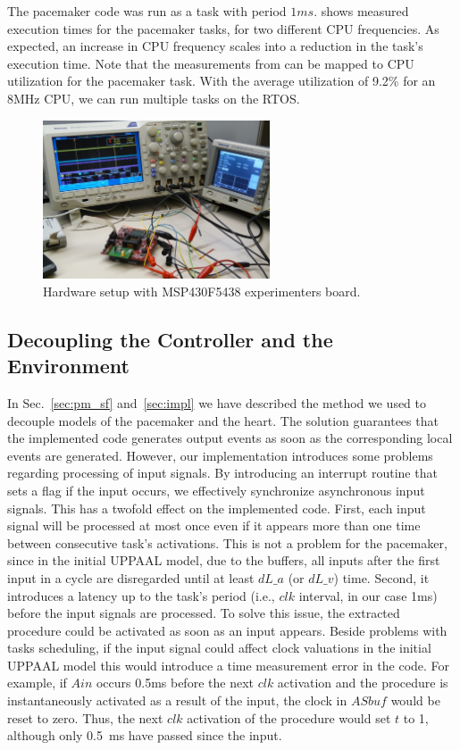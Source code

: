 The pacemaker code was run as a task with period $1ms$.  shows measured execution times for the pacemaker tasks, for two different CPU frequencies. As expected, an increase in CPU frequency scales into a reduction in the task's execution time. Note that the measurements from  can be mapped to CPU utilization for the pacemaker task. With the average utilization of 9.2\% for an 8MHz CPU, we can run multiple tasks on the RTOS. 


\begin{figure} [!t]
\center
\includegraphics[width=0.6\textwidth]{figs/HW_setup1.png}
\caption{Hardware setup with MSP430F5438 experimenters board.}
\label{fig:setup}
\end{figure}



\subsection{Decoupling the Controller and the Environment}
\label{sec:disc_IO}
In Sec.~\ref{sec:pm_sf} and~\ref{sec:impl} we have described the method we used to decouple models of the pacemaker and the heart. The solution guarantees that the implemented code generates output events as soon as the corresponding local events are generated. However, our implementation introduces some problems regarding processing of input signals. By introducing an interrupt routine that sets a flag if the input occurs, we effectively synchronize asynchronous input signals. This has a twofold effect on the implemented code. First, each input signal will be processed at most once even if it appears more than one time between consecutive task's activations. This is not a problem for the pacemaker, since in the initial UPPAAL model, due to the buffers,  all inputs after the first input in a cycle are disregarded until at least $dL\_a$ (or $dL\_v$) time. 
Second, it introduces a latency up to the task's period (i.e., $clk$ interval, in our case 1ms) before the input signals are processed. To solve this issue, the extracted procedure could be activated as soon as an input appears. Beside problems with tasks scheduling, if the input signal could affect clock valuations in the initial UPPAAL model this would introduce a time measurement error in the code. For example, if $Ain$ occurs 0.5ms before the next $clk$ activation and the procedure is instantaneously activated as a result of the input, the clock in $ASbuf$ would be reset to zero. Thus, the next $clk$ activation of the procedure would set $t$ to 1, although only 0.5~ms have passed since the input. 

